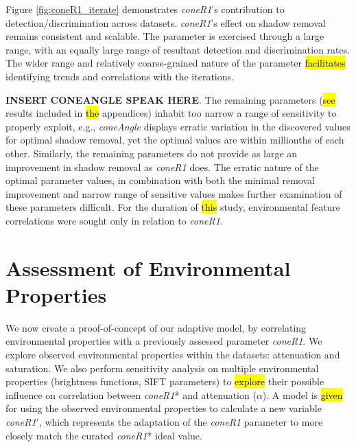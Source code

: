 Figure \ref{fig:coneR1_iterate} demonstrates \textit{coneR1}'s contribution to detection/discrimination across datasets. \textit{coneR1}'s effect on shadow removal remains consistent and scalable. The parameter is exercised through a large range, with an equally large range of resultant detection and discrimination rates. The wider range and relatively coarse-grained nature of the parameter \hl{facilitates} identifying trends and correlations with the iterations. 


\textbf{INSERT CONEANGLE SPEAK HERE}. The remaining parameters (\hl{see} results included in \hl{the} appendices) inhabit too narrow a range of sensitivity to properly exploit, e.g., \textit{coneAngle} displays erratic variation in the discovered values for optimal shadow removal, yet the optimal values are within millionths of each other. Similarly, the remaining parameters do not provide as large an improvement in shadow removal as \textit{coneR1} does. The erratic nature of the optimal parameter values, in combination with both the minimal removal improvement and narrow range of sensitive values makes further examination of these parameters difficult. For the duration of \hl{this} study, environmental feature correlations were sought only in relation to \textit{coneR1}.

\section{Assessment of Environmental Properties} \label{section:envassess}

We now create a proof-of-concept of our adaptive model, by correlating environmental properties with a previously assessed parameter \textit{coneR1}. We explore observed environmental properties within the datasets: attenuation and saturation. We also perform sensitivity analysis on multiple environmental properties (brightness functions, SIFT parameters) to \hl{explore} their possible influence on correlation between \textit{coneR1}* and attenuation ($\alpha$). A model is \hl{given} for using the observed environmental properties to calculate a new variable \textit{coneR1}$'$, which represents the adaptation of the \textit{coneR1} parameter to more closely match the curated \textit{coneR1}* ideal value.

